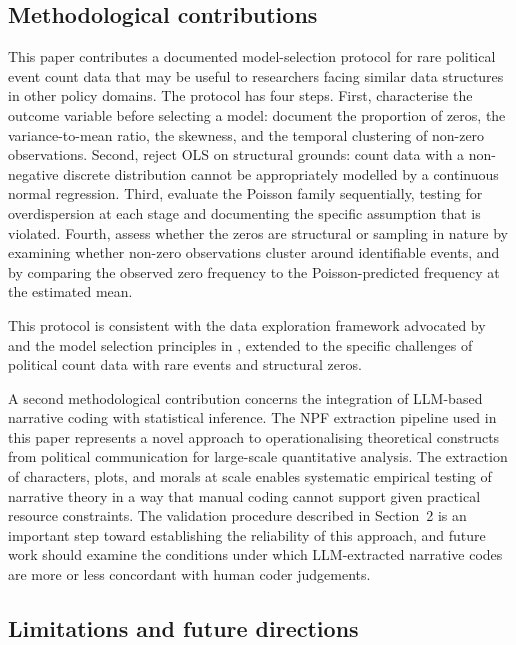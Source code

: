 \documentclass[11pt]{article}
\begin{document}
\subsection{Methodological contributions}
 
This paper contributes a documented model-selection protocol for rare
political event count data that may be useful to researchers facing
similar data structures in other policy domains. The protocol has four
steps. First, characterise the outcome variable before selecting a model:
document the proportion of zeros, the variance-to-mean ratio, the
skewness, and the temporal clustering of non-zero observations. Second,
reject OLS on structural grounds: count data with a non-negative
discrete distribution cannot be appropriately modelled by a continuous
normal regression. Third, evaluate the Poisson family sequentially,
testing for overdispersion at each stage and documenting the specific
assumption that is violated. Fourth, assess whether the zeros are
structural or sampling in nature by examining whether non-zero
observations cluster around identifiable events, and by comparing the
observed zero frequency to the Poisson-predicted frequency at the
estimated mean.
 
This protocol is consistent with the data exploration framework
advocated by \citet{Zuur2010} and the model selection principles in
\citet{Burnham2002}, extended to the specific challenges of political
count data with rare events and structural zeros.
 
A second methodological contribution concerns the integration of
LLM-based narrative coding with statistical inference. The NPF
extraction pipeline \citep{Jones2014} used in this paper represents
a novel approach to operationalising theoretical constructs from
political communication for large-scale quantitative analysis. The
extraction of characters, plots, and morals at scale enables
systematic empirical testing of narrative theory in a way that manual
coding cannot support given practical resource constraints. The
validation procedure described in Section~2 is an important step
toward establishing the reliability of this approach, and future work
should examine the conditions under which LLM-extracted narrative
codes are more or less concordant with human coder judgements.
 
\subsection{Limitations and future directions}
 
\end{document}
